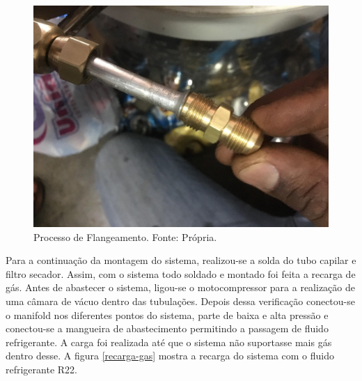                         \begin{figure}[!htb]
                            \centering
                            \includegraphics[scale= 0.2]{figuras/processo-flagelamento.png}
                            \caption{Processo de Flangeamento. Fonte: Própria.}
                            \label{processo-flageamento}
                        \end{figure}

                        Para a continuação da montagem do sistema, realizou-se a solda do tubo capilar
                        e filtro secador. Assim, com o sistema todo soldado e montado foi feita a
                        recarga de gás. Antes de abastecer o sistema, ligou-se o motocompressor para a
                        realização de uma câmara de vácuo dentro das tubulações. Depois dessa verificação
                        conectou-se o manifold nos diferentes pontos do sistema, parte de baixa e alta
                        pressão e conectou-se a mangueira de abastecimento permitindo a passagem de
                        fluido refrigerante. A carga foi realizada até que o sistema não suportasse
                        mais gás dentro desse. A figura \ref{recarga-gas} mostra a recarga do sistema com o
                        fluido refrigerante R22. 

